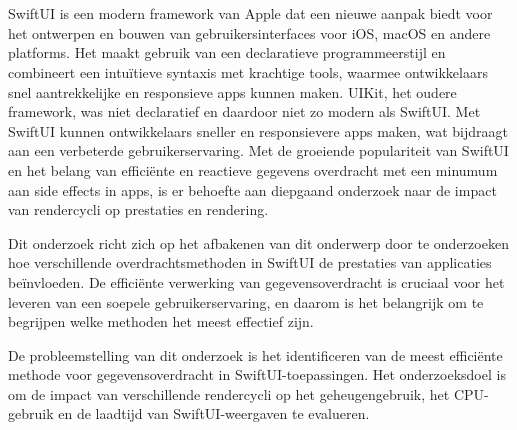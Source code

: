 
\chapter{}%
\label{ch:inleiding}

SwiftUI is een modern framework van Apple dat een nieuwe aanpak biedt voor het ontwerpen en bouwen van gebruikersinterfaces voor iOS, macOS en andere platforms. Het maakt gebruik van een declaratieve programmeerstijl en combineert een intuïtieve syntaxis met krachtige tools, waarmee ontwikkelaars snel aantrekkelijke en responsieve apps kunnen maken. UIKit, het oudere framework, was niet declaratief en daardoor niet zo modern als SwiftUI. Met SwiftUI kunnen ontwikkelaars sneller en responsievere apps maken, wat bijdraagt aan een verbeterde gebruikerservaring. Met de groeiende populariteit van SwiftUI en het belang van efficiënte en reactieve gegevens overdracht met een minumum aan side effects in apps, is er behoefte aan diepgaand onderzoek naar de impact van rendercycli op prestaties en rendering.

Dit onderzoek richt zich op het afbakenen van dit onderwerp door te onderzoeken hoe verschillende overdrachtsmethoden in SwiftUI de prestaties van applicaties beïnvloeden. De efficiënte verwerking van gegevensoverdracht is cruciaal voor het leveren van een soepele gebruikerservaring, en daarom is het belangrijk om te begrijpen welke methoden het meest effectief zijn.

De probleemstelling van dit onderzoek is het identificeren van de meest efficiënte methode voor gegevensoverdracht in SwiftUI-toepassingen. Het onderzoeksdoel is om de impact van verschillende rendercycli op het geheugengebruik, het CPU-gebruik en de laadtijd van SwiftUI-weergaven te evalueren.

\section{}%
\label{sec:probleemstelling}

